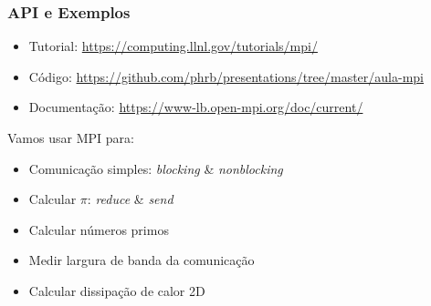 \documentclass[12pt, compress, aspectratio=169, xcolor={table,usenames,dvipsnames}]{beamer}
\begin{document}
\begin{frame}
    \frametitle{API e Exemplos}
    \begin{itemize}
        \item \alert{Tutorial}: \url{https://computing.llnl.gov/tutorials/mpi/}
        \item \alert{Código}: \url{https://github.com/phrb/presentations/tree/master/aula-mpi}
        \item \alert{Documentação}: \url{https://www-lb.open-mpi.org/doc/current/}
    \end{itemize}

    Vamos usar MPI para:

    \begin{itemize}
        \item Comunicação simples: \textit{blocking} \& \textit{nonblocking}
        \item Calcular $\pi$: \textit{reduce} \& \textit{send}
        \item Calcular números primos
        \item Medir largura de banda da comunicação
        \item Calcular dissipação de calor 2D
    \end{itemize}
\end{frame}

\maketitle
\end{document}

